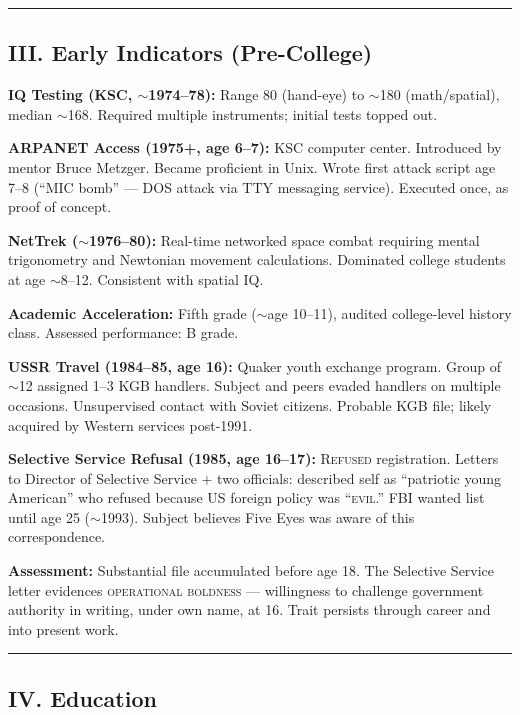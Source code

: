 \vspace{1cm}\hrule\vspace{1cm}

\subsection*{III. Early Indicators (Pre-College)}
\label{record:tgt-early-indicators-pre-college}

\textbf{IQ Testing (KSC, $\sim$1974--78):} Range 80 (hand-eye) to $\sim$180 (math/spatial), median $\sim$168. Required multiple instruments; initial tests topped out.

\textbf{ARPANET Access (1975+, age 6--7):} KSC computer center. Introduced by mentor Bruce Metzger. Became proficient in Unix. Wrote first attack script age 7--8 (``MIC bomb'' --- DOS attack via TTY messaging service). Executed once, as proof of concept.

\textbf{NetTrek ($\sim$1976--80):} Real-time networked space combat requiring mental trigonometry and Newtonian movement calculations. Dominated college students at age $\sim$8--12. Consistent with spatial IQ.

\textbf{Academic Acceleration:} Fifth grade ($\sim$age 10--11), audited college-level history class. Assessed performance: B grade.

\textbf{USSR Travel (1984--85, age 16):} Quaker youth exchange program. Group of $\sim$12 assigned 1--3 KGB handlers. Subject and peers evaded handlers on multiple occasions. Unsupervised contact with Soviet citizens. Probable KGB file; likely acquired by Western services post-1991.

\textbf{Selective Service Refusal (1985, age 16--17):} \textsc{Refused} registration. Letters to Director of Selective Service + two officials: described self as ``patriotic young American'' who refused because US foreign policy was ``\textsc{evil}.'' FBI wanted list until age 25 ($\sim$1993). Subject believes Five Eyes was aware of this correspondence.

\textbf{Assessment:} Substantial file accumulated before age 18. The Selective Service letter evidences \textsc{operational boldness} --- willingness to challenge government authority in writing, under own name, at 16. Trait persists through career and into present work.

\vspace{1cm}\hrule\vspace{1cm}

\subsection*{IV. Education}
\label{record:tgt-education}

